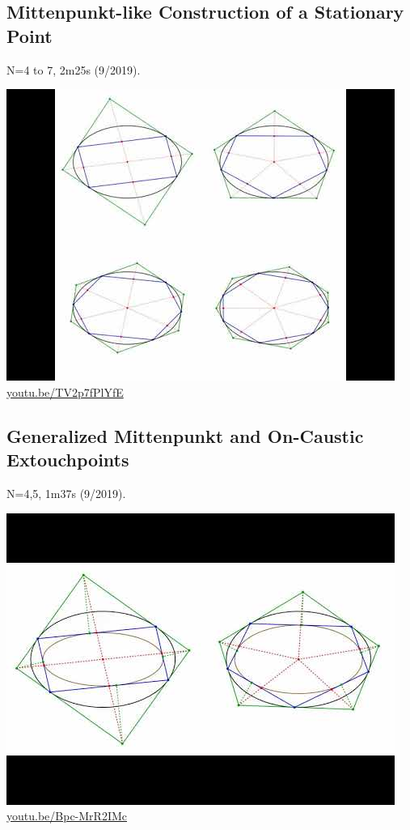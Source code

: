 \documentclass[12pt]{amsart}
\begin{document}
\subsection{Mittenpunkt-like Construction of a Stationary Point}
\label{vid:TV2p7fPlYfE}
\noindent N=4 to 7, 2m25s (9/2019). 
\begin{center}\includegraphics[width=.5\textwidth]{pics/TV2p7fPlYfE.jpg} \\ 
\href{https://youtu.be/TV2p7fPlYfE}{\url{youtu.be/TV2p7fPlYfE}}\end{center}
% 

\subsection{Generalized Mittenpunkt and On-Caustic Extouchpoints}
\label{vid:Bpc-MrR2IMc}
\noindent N=4,5, 1m37s (9/2019). 
\begin{center}\includegraphics[width=.5\textwidth]{pics/Bpc-MrR2IMc.jpg} \\ 
\href{https://youtu.be/Bpc-MrR2IMc}{\url{youtu.be/Bpc-MrR2IMc}}\end{center}
% 
\end{document}
